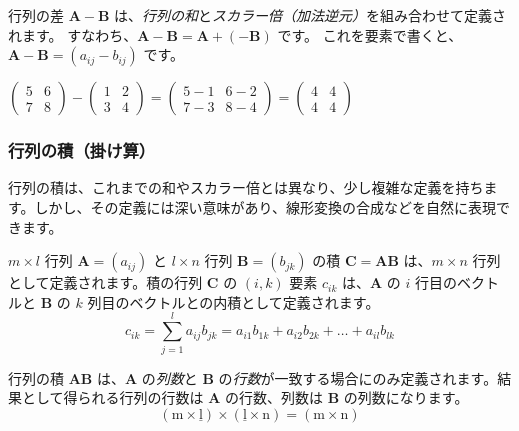 行列の差 $\bm{A} - \bm{B}$ は、\emph{行列の和}と\emph{スカラー倍（加法逆元）}を組み合わせて定義されます。
すなわち、$\bm{A} - \bm{B} = \bm{A} + (-\bm{B})$ です。
これを要素で書くと、$\bm{A} - \bm{B} = (a_{ij} - b_{ij})$ です。

\begin{ex}
$\begin{pmatrix} 5 & 6 \\ 7 & 8 \end{pmatrix} - \begin{pmatrix} 1 & 2 \\ 3 & 4 \end{pmatrix} = \begin{pmatrix} 5-1 & 6-2 \\ 7-3 & 8-4 \end{pmatrix} = \begin{pmatrix} 4 & 4 \\ 4 & 4 \end{pmatrix}$
\end{ex}

\subsubsection{行列の積（掛け算）}

行列の積は、これまでの和やスカラー倍とは異なり、少し複雑な定義を持ちます。しかし、その定義には深い意味があり、線形変換の合成などを自然に表現できます。

\begin{dfn}[行列の積] \label{matrix_product}
$m \times l$ 行列 $\bm{A} = (a_{ij})$ と $l \times n$ 行列 $\bm{B} = (b_{jk})$ の積 $\bm{C} = \bm{A}\bm{B}$ は、$m \times n$ 行列として定義されます。積の行列 $\bm{C}$ の $(i,k)$ 要素 $c_{ik}$ は、$\bm{A}$ の $i$ 行目のベクトルと $\bm{B}$ の $k$ 列目のベクトルとの内積として定義されます。
\[c_{ik} = \sum_{j=1}^{l} a_{ij} b_{jk} = a_{i1}b_{1k} + a_{i2}b_{2k} + \dots + a_{il}b_{lk}\]
\end{dfn}

\begin{rmk*}
行列の積 $\bm{A}\bm{B}$ は、$\bm{A}$ の\emph{列数}と $\bm{B}$ の\emph{行数}が一致する場合にのみ定義されます。結果として得られる行列の行数は $\bm{A}$ の行数、列数は $\bm{B}$ の列数になります。
\[(\text{m} \times \underline{\text{l}}) \times (\underline{\text{l}} \times \text{n}) = (\text{m} \times \text{n})\]
\end{rmk*}


